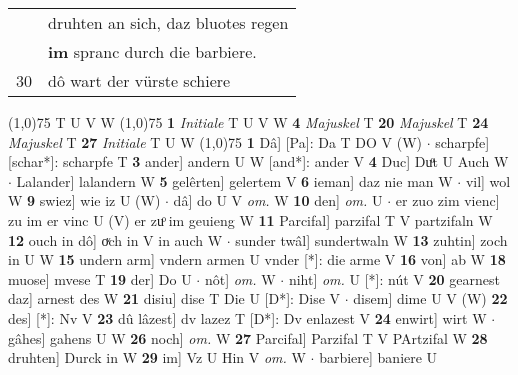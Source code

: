\documentclass[8pt,a4paper,notitlepage]{article}
\begin{document}
\begin{table}[ht]
\begin{minipage}[t]{0.5\linewidth}
\begin{tabular}{rl}
 & druhten an sich, daz bluotes regen\\ 
 & \textbf{im} spranc durch die barbiere.\\ 
30 & dô wart der vürste schiere\\ 
\end{tabular}
\scriptsize
\line(1,0){75} \newline
T U V W \newline
\line(1,0){75} \newline
\textbf{1} \textit{Initiale} T U V W  \textbf{4} \textit{Majuskel} T  \textbf{20} \textit{Majuskel} T  \textbf{24} \textit{Majuskel} T  \textbf{27} \textit{Initiale} T U W  \newline
\line(1,0){75} \newline
\textbf{1} Dâ] [Pa]: Da T DO V (W)  $\cdot$ scharpfe] [schar*]: scharpfe T \textbf{3} ander] andern U W [and*]: ander V \textbf{4} Duc] Duͦt U Auch W  $\cdot$ Lalander] lalandern W \textbf{5} gelêrten] gelertem V \textbf{6} ieman] daz nie man W  $\cdot$ vil] wol W \textbf{9} swiez] wie iz U (W)  $\cdot$ dâ] do U V \textit{om.} W \textbf{10} den] \textit{om.} U  $\cdot$ er zuo zim vienc] zu im er vinc U (V) er zuͦ im geuieng W \textbf{11} Parcifal] parzifal T V partzifaln W \textbf{12} ouch in dô] oͮch in V in auch W  $\cdot$ sunder twâl] sundertwaln W \textbf{13} zuhtin] zoch in U W \textbf{15} undern arm] vndern armen U vnder [*]: die arme V \textbf{16} von] ab W \textbf{18} muose] mvese T \textbf{19} der] Do U  $\cdot$ nôt] \textit{om.} W  $\cdot$ niht] \textit{om.} U [*]: nút V \textbf{20} gearnest daz] arnest des W \textbf{21} disiu] dise T Die U [D*]: Dise V  $\cdot$ disem] dime U V (W) \textbf{22} des] [*]: Nv V \textbf{23} dû lâzest] dv lazez T [D*]: Dv enlazest V \textbf{24} enwirt] wirt W  $\cdot$ gâhes] gahens U W \textbf{26} noch] \textit{om.} W \textbf{27} Parcifal] Parzifal T V PArtzifal W \textbf{28} druhten] Durck in W \textbf{29} im] Vz U Hin V \textit{om.} W  $\cdot$ barbiere] baniere U \newline
\end{minipage}
\end{table}
\end{document}
